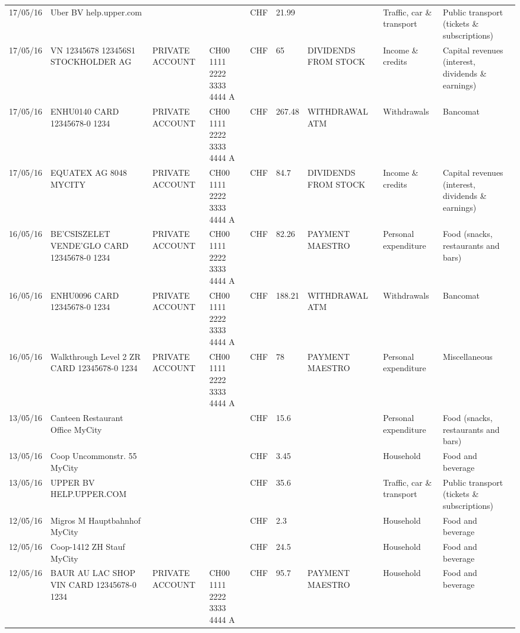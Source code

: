 \begin{landscape}
\begin{table}[t]
\begin{center}
\begin{tabular}{lllllllll}
		17/05/16 & Uber BV                  help.upper.com &       &       & CHF   & 21.99 &       & Traffic, car \& transport & Public transport (tickets \& subscriptions) \\
		17/05/16 & VN 12345678     123456S1 STOCKHOLDER AG & PRIVATE ACCOUNT & CH00 1111 2222 3333 4444 A & CHF   & 65    & DIVIDENDS FROM STOCK & Income \& credits & Capital revenues (interest, dividends \& earnings) \\
		17/05/16 & ENHU0140 CARD 12345678-0 1234 & PRIVATE ACCOUNT & CH00 1111 2222 3333 4444 A & CHF   & 267.48 & WITHDRAWAL ATM & Withdrawals & Bancomat \\
		17/05/16 & EQUATEX AG 8048 MYCITY & PRIVATE ACCOUNT & CH00 1111 2222 3333 4444 A & CHF   & 84.7  & DIVIDENDS FROM STOCK & Income \& credits & Capital revenues (interest, dividends \& earnings) \\
		16/05/16 & BE'CSISZELET VENDE'GLO CARD 12345678-0 1234 & PRIVATE ACCOUNT & CH00 1111 2222 3333 4444 A & CHF   & 82.26 & PAYMENT MAESTRO & Personal expenditure & Food (snacks, restaurants and bars) \\
		16/05/16 & ENHU0096 CARD 12345678-0 1234 & PRIVATE ACCOUNT & CH00 1111 2222 3333 4444 A & CHF   & 188.21 & WITHDRAWAL ATM & Withdrawals & Bancomat \\
		16/05/16 & Walkthrough Level 2 ZR CARD 12345678-0 1234 & PRIVATE ACCOUNT & CH00 1111 2222 3333 4444 A & CHF   & 78    & PAYMENT MAESTRO & Personal expenditure & Miscellaneous \\
		13/05/16 & Canteen Restaurant Office      MyCity &       &       & CHF   & 15.6  &       & Personal expenditure & Food (snacks, restaurants and bars) \\
		13/05/16 & Coop Uncommonstr. 55   MyCity &       &       & CHF   & 3.45  &       & Household & Food and beverage \\
		13/05/16 & UPPER BV                  HELP.UPPER.COM &       &       & CHF   & 35.6  &       & Traffic, car \& transport & Public transport (tickets \& subscriptions) \\
		12/05/16 & Migros M Hauptbahnhof    MyCity &       &       & CHF   & 2.3   &       & Household & Food and beverage \\
		12/05/16 & Coop-1412 ZH Stauf       MyCity &       &       & CHF   & 24.5  &       & Household & Food and beverage \\
		12/05/16 & BAUR AU LAC SHOP VIN CARD 12345678-0 1234 & PRIVATE ACCOUNT & CH00 1111 2222 3333 4444 A & CHF   & 95.7  & PAYMENT MAESTRO & Household & Food and beverage \\

\end{tabular}
\end{center}
\end{table}
\end{landscape}
